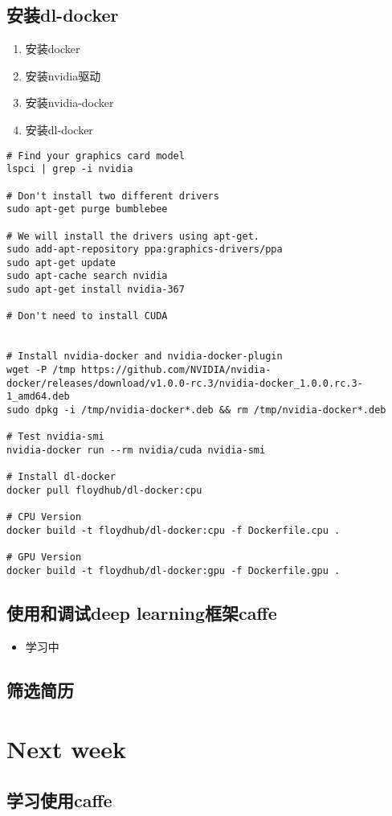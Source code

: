 \documentclass[11pt]{article}
\begin{document}
\subsection{安装dl-docker}
\label{sec:orgheadline4}
\begin{enumerate}
\item 安装docker
\item 安装nvidia驱动
\item 安装nvidia-docker
\item 安装dl-docker
\end{enumerate}
\begin{verbatim}
# Find your graphics card model
lspci | grep -i nvidia

# Don't install two different drivers
sudo apt-get purge bumblebee

# We will install the drivers using apt-get.
sudo add-apt-repository ppa:graphics-drivers/ppa
sudo apt-get update
sudo apt-cache search nvidia
sudo apt-get install nvidia-367

# Don't need to install CUDA


# Install nvidia-docker and nvidia-docker-plugin
wget -P /tmp https://github.com/NVIDIA/nvidia-docker/releases/download/v1.0.0-rc.3/nvidia-docker_1.0.0.rc.3-1_amd64.deb
sudo dpkg -i /tmp/nvidia-docker*.deb && rm /tmp/nvidia-docker*.deb

# Test nvidia-smi
nvidia-docker run --rm nvidia/cuda nvidia-smi

# Install dl-docker
docker pull floydhub/dl-docker:cpu

# CPU Version
docker build -t floydhub/dl-docker:cpu -f Dockerfile.cpu .

# GPU Version
docker build -t floydhub/dl-docker:gpu -f Dockerfile.gpu .
\end{verbatim}
\subsection{使用和调试deep learning框架caffe}
\label{sec:orgheadline5}
\begin{itemize}
\item 学习中
\end{itemize}
\subsection{筛选简历}
\label{sec:orgheadline6}

\section{Next week}
\label{sec:orgheadline9}
\subsection{学习使用caffe}
\label{sec:orgheadline8}
\end{document}
